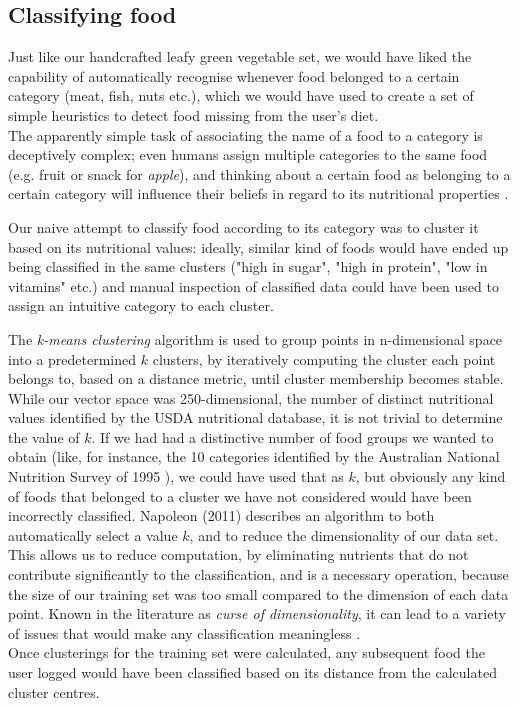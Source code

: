 \subsection{Classifying food}
Just like our handcrafted leafy green vegetable set, we would have liked the capability of automatically recognise whenever food belonged to a certain category (meat, fish, nuts etc.), which we would have used to create a set of simple heuristics to detect food missing from the user's diet. \\
The apparently simple task of associating the name of a food to a category is deceptively complex; even humans assign multiple categories to the same food (e.g. fruit or snack for \textit{apple}), and thinking about a certain food as belonging to a certain category will influence their beliefs in regard to its nutritional properties \cite{Hayes2011}.

Our naive attempt to classify food  according to its category was to cluster it based on its nutritional values: ideally, similar kind of foods would have ended up being classified in the same clusters ("high in sugar", "high in protein", "low in vitamins" etc.) and manual inspection of classified data could have been used to assign an intuitive category to each cluster. 

The \textit{k-means clustering} algorithm is used to group points in n-dimensional space into a predetermined $k$ clusters, by iteratively computing the cluster each point belongs to, based on a distance metric, until cluster membership becomes stable.\\
While our vector space was 250-dimensional, the number of distinct nutritional values identified by the USDA nutritional database, it is not trivial to determine the value of $k$. If we had had a distinctive number of food groups we wanted to obtain (like, for instance, the 10 categories identified by the Australian National Nutrition Survey of 1995 \cite{NNS1995}), we could have used that as $k$, but obviously any kind of foods that belonged to a cluster we have not considered would have been incorrectly classified. Napoleon (2011)\cite{napoleon} describes an algorithm to both automatically select a value $k$, and to reduce the dimensionality of our data set. This allows us to reduce computation, by eliminating nutrients that do not contribute significantly to the classification, and is a necessary operation, because the size of our training set was too small compared to the dimension of each data point. Known in the literature as \textit{curse of dimensionality}, it can lead to a variety of issues that would make any classification meaningless \cite{kriegel2009}.\\
Once clusterings for the training set were calculated, any subsequent food the user logged would have been classified based on its distance from the calculated cluster centres.

